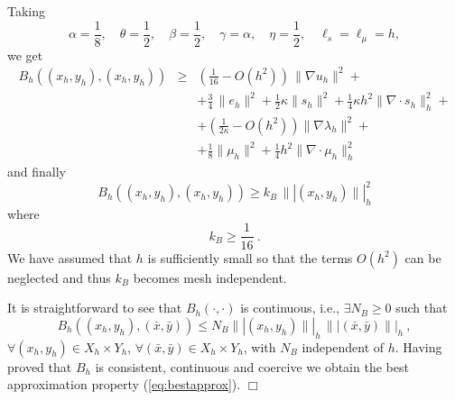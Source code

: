 \documentclass{article}
\begin{document}
Taking
$$
\alpha = \frac{1}{8}, \quad \theta=\frac12,\quad \beta=\frac12,
\quad \gamma=\alpha, \quad \eta = \frac12,
\quad \ell_s = \ell_\mu = h, 
$$
we get
\begin{eqnarray*}
B_h\left ( (x_h,y_h),(x_h,y_h) \right ) &\geq  &
\left ( \frac{1}{16} - O(h^2) \right )\, \|\nabla u_h\|^2+\\
& & +\frac{3}{4}\,\|e_h\|^2+\frac12 \kappa \|s_h\|^2 + \frac14 \kappa h^2 \|\nabla \cdot s_h\|_h^2 + \\
& &
+\left (\frac{1}{2\kappa}  -O(h^2) \right ) \|\nabla \lambda_h\|^2 + \\
& & + \frac18 \|\mu_h\|^2  +\frac14 h^2 \|\nabla \cdot \mu_h\|_h^2 
\end{eqnarray*}
and finally
\begin{equation}
B_h\left ( (x_h,y_h),({x}_h,{y}_h) \right ) \geq 
k_B \, \| |(x_h,y_h)  \| |_h^2 
\end{equation}
where
\begin{equation}
k_B \geq \frac{1}{16}~.
\end{equation}
We have assumed that $h$ is sufficiently small so that the terms $O(h^2)$ can be neglected and thus $k_B$ becomes mesh independent. 

It is straightforward to see that $B_h(\cdot,\cdot)$ is continuous, i.e., $\exists N_B\geq 0$ such that
\begin{equation}
B_h\left ( (x_h,y_h),(\bar{x},\bar{y}) \right ) \leq N_B \||(x_h,y_h)\||_h\,\||(\bar{x},\bar{y})\||_h~,
\end{equation}
$ \forall (x_h,y_h) \in X_h\times Y_h$, $\forall (\bar{x},\bar{y})\in X_h\times Y_h$, with $N_B$ independent of $h$. Having proved that $B_h$ is consistent, continuous and coercive we obtain the best approximation property (\ref{eq:bestapprox}). $\Box$
\end{document}
